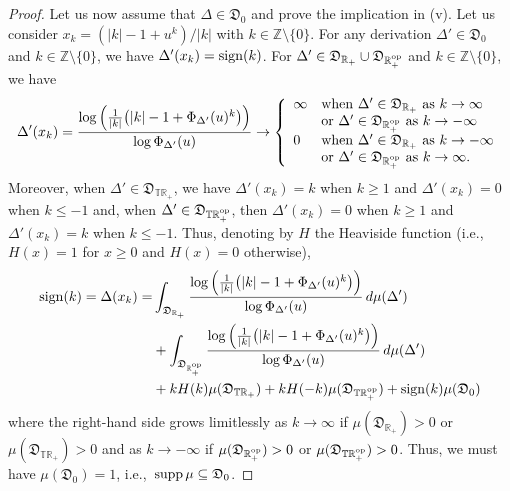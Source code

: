 \documentclass[12pt,a4paper,reqno]{amsart}
\theoremstyle{definition}
\newcommand{\mf}[1]{\mathfrak{#1}}
\newcommand{\R}{\mathbb R}
\newcommand{\Z}{\mathbb Z}
\newcommand{\T}{\mathbb T}
\let\originalleft\left
\let\originalright\right
\renewcommand{\left}{\mathopen{}\mathclose\bgroup\originalleft}
\renewcommand{\right}{\aftergroup\egroup\originalright}
\begin{document}
\begin{proof}
Let us now assume that $\Delta\in\mf D_0$ and prove the implication in (v). Let us consider $x_k=(|k|-1+u^k)/|k|$ with $k\in\Z\setminus\{0\}$. For any derivation $\Delta'\in\mf D_0$ and $k\in\Z\setminus\{0\}$, we have $\Delta'(x_k)={\rm sign}(k)$. For $\Delta'\in\mf D_{\R_+}\cup\mf D_{\R_+^{\rm op}}$ and $k\in\Z\setminus\{0\}$, we have
$$
\Delta'(x_k)=\frac{\log{\left(\frac{1}{|k|}\big(|k|-1+\Phi_{\Delta'}(u)^k\big)\right)}}{\log{\Phi_{\Delta'}(u)}}\to\left\{\begin{array}{ll}
\infty&{\rm when}\ \Delta'\in\mf D_{\R_+}\ {\rm as}\ k\to\infty\\
&{\rm or}\ \Delta'\in\mf D_{\R_+^{\rm op}}\ {\rm as}\ k\to-\infty\\
0&{\rm when}\ \Delta'\in\mf D_{\R_+}\ {\rm as}\ k\to-\infty\\
&{\rm or}\ \Delta'\in\mf D_{\R_+^{\rm op}}\ {\rm as}\ k\to\infty.
\end{array}\right.
$$
Moreover, when $\Delta'\in\mf D_{\T\R_+}$, we have $\Delta'(x_k)=k$ when $k\geq 1$ and $\Delta'(x_k)=0$ when $k\leq -1$ and, when $\Delta'\in\mf D_{\T\R_+^{\rm op}}$, then $\Delta'(x_k)=0$ when $k\geq 1$ and $\Delta'(x_k)=k$ when $k\leq -1$. Thus, denoting by $H$ the Heaviside function (i.e.,\ $H(x)=1$ for $x\geq0$ and $H(x)=0$ otherwise),
\begin{align*}
{\rm sign}(k)=\Delta(x_k)=&\int_{\mf D_{\R_+}}\frac{\log{\left(\frac{1}{|k|}\big(|k|-1+\Phi_{\Delta'}(u)^k\big)\right)}}{\log{\Phi_{\Delta'}(u)}}\,d\mu(\Delta')\\
&+\int_{\mf D_{\R_+^{\rm op}}}\frac{\log{\left(\frac{1}{|k|}\big(|k|-1+\Phi_{\Delta'}(u)^k\big)\right)}}{\log{\Phi_{\Delta'}(u)}}\,d\mu(\Delta')\\
&+kH(k)\mu(\mf D_{\T\R_+})+kH(-k)\mu(\mf D_{\T\R_+^{\rm op}})+{\rm sign}(k)\mu(\mf D_0)
\end{align*}
where the right-hand side grows limitlessly as $k\to\infty$ if $\mu(\mf D_{\R_+})>0$ or $\mu(\mf D_{\T\R_+})>0$ and as $k\to-\infty$ if $\mu(\mf D_{\R_+^{\rm op}})>0$ or $\mu(\mf D_{\T\R_+^{\rm op}})>0$. Thus, we must have $\mu(\mf D_0)=1$, i.e.,\ ${\rm supp}\,\mu\subseteq\mf D_0$.


\end{proof}
\end{document}
